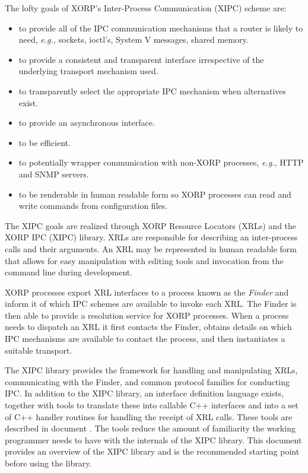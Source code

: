 \documentclass[11pt]{article}
\newcommand{\eg}{\emph{e.g.,}\xspace}
\begin{document}
The lofty goals of XORP's Inter-Process Communication (XIPC) scheme are:

\begin{itemize}

  \item to provide all of the IPC communication mechanisms that a router is
  likely to need, \eg sockets, ioctl's, System V messages, shared memory.

  \item to provide a consistent and transparent interface irrespective
  of the underlying transport mechanism used.

  \item to transparently select the appropriate IPC mechanism when
  alternatives exist.

  \item to provide an asynchronous interface.

  \item to be efficient.

  \item to potentially wrapper communication with non-XORP processes,
  \eg HTTP and SNMP servers.

  \item to be renderable in human readable form so XORP processes can
  read and write commands from configuration files.

\end{itemize}

The XIPC goals are realized through XORP Resource Locators (XRLs) and
the XORP IPC (XIPC) library.  XRLs are responsible for describing an
inter-process calls and their arguments.  An XRL may be represented in
human readable form that allows for easy manipulation with editing
tools and invocation from the command line during development.

XORP processes export XRL interfaces to a process known as the {\em
Finder} and inform it of which IPC schemes are available to invoke
each XRL.  The Finder is then able to provide a resolution service for
XORP processes.  When a process needs to dispatch an XRL it first
contacts the Finder, obtains details on which IPC mechanisms are
available to contact the process, and then instantiates
a suitable transport.

The XIPC library provides the framework for handling and manipulating
XRLs, communicating with the Finder, and common protocol families for
conducting IPC.  In addition to the XIPC library, an interface
definition language exists, together with tools to translate these
into callable C++ interfaces and into a set of C++ handler routines
for handling the receipt of XRL calls.  These tools are described in
document \cite{xorp:xrl_interfaces}.  The tools reduce the amount of
familiarity the working programmer needs to have with the internals of
the XIPC library.  This document provides an overview of the XIPC
library and is the recommended starting point before using the
library.
\end{document}
